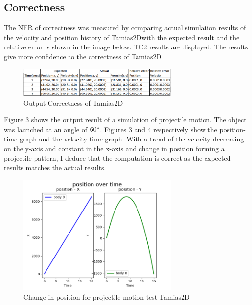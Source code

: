 \documentclass[12pt, titlepage]{article}
\newcommand{\progname}{Tamias2D}
\begin{document}
\subsection{Correctness}
The NFR of correctness was measured by comparing actual simulation results of the velocity and position history of \progname with the expected result and the relative error is shown in the image below. TC2 results are displayed. The results give more confidence to the correctness of \progname
~\newline
\begin{figure}[htbp]
	
	\begin{center}
		
{
		\includegraphics[width=0.71\textwidth]{OutputTC1.png}
			
} 
		\caption{\label{Fig_stresstest}Output Correctness of \progname{}}
		
	\end{center}
	
\end{figure}

Figure 3 shows the output result of a simulation of projectile motion. The object was launched at an angle of $60\degree$. Figures 3 and 4 respectively show the position-time graph and the velocity-time graph. With a trend of the velocity decreasing on the y-axis and constant in the x-axis and change in position forming a projectile pattern, I deduce that the computation is correct as the expected results matches the actual results.
\begin{figure}[htbp]
	
	\begin{center}
		
		{
			\includegraphics[width=0.71\textwidth]{projectile_60p.png}
			
		} 
		\caption{\label{Fig_projectile_60p}Change in position for projectile motion test \progname{}}
		
	\end{center}
	
\end{figure}
\end{document}
